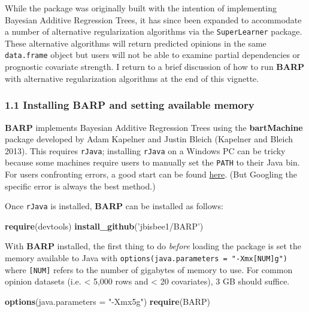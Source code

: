 \documentclass[]{article}
\newenvironment{Shaded}{\begin{snugshade}}{\end{snugshade}}
\newcommand{\KeywordTok}[1]{\textcolor[rgb]{0.13,0.29,0.53}{\textbf{#1}}}
\newcommand{\DataTypeTok}[1]{\textcolor[rgb]{0.13,0.29,0.53}{#1}}
\newcommand{\StringTok}[1]{\textcolor[rgb]{0.31,0.60,0.02}{#1}}
\newcommand{\NormalTok}[1]{#1}
\begin{document}
While the package was originally built with the intention of
implementing Bayesian Additive Regression Trees, it has since been
expanded to accommodate a number of alternative regularization
algorithms via the \texttt{SuperLearner} package. These alternative
algorithms will return predicted opinions in the same
\texttt{data.frame} object but users will not be able to examine partial
dependencies or prognostic covariate strength. I return to a brief
discussion of how to run \textbf{BARP} with alternative regularization
algorithms at the end of this vignette.

\subsubsection{\texorpdfstring{1.1 Installing \textbf{BARP} and setting
available
memory}{1.1 Installing BARP and setting available memory}}\label{installing-barp-and-setting-available-memory}

\textbf{BARP} implements Bayesian Additive Regression Trees using the
\textbf{bartMachine} package developed by Adam Kapelner and Justin
Bleich (Kapelner and Bleich 2013). This requires \texttt{rJava};
installing \texttt{rJava} on a Windows PC can be tricky because some
machines require users to manually set the \texttt{PATH} to their Java
bin. For users confronting errors, a good start can be found
\href{https://www.r-statistics.com/2012/08/how-to-load-the-rjava-package-after-the-error-java_home-cannot-be-determined-from-the-registry/}{here}.
(But Googling the specific error is always the best method.)

Once \texttt{rJava} is installed, \textbf{BARP} can be installed as
follows:

\begin{Shaded}
\begin{Highlighting}[]
\KeywordTok{require}\NormalTok{(devtools)}
\KeywordTok{install_github}\NormalTok{(}\StringTok{'jbisbee1/BARP'}\NormalTok{)}
\end{Highlighting}
\end{Shaded}

With \textbf{BARP} installed, the first thing to do \emph{before}
loading the package is set the memory available to Java with
\texttt{options(java.parameters\ =\ "-Xmx{[}NUM{]}g")} where
\texttt{{[}NUM{]}} refers to the number of gigabytes of memory to use.
For common opinion datasets (i.e. \textless{} 5,000 rows and \textless{}
20 covariates), 3 GB should suffice.

\begin{Shaded}
\begin{Highlighting}[]
\KeywordTok{options}\NormalTok{(}\DataTypeTok{java.parameters =} \StringTok{"-Xmx5g"}\NormalTok{)}
\KeywordTok{require}\NormalTok{(BARP)}
\end{Highlighting}
\end{Shaded}
\end{document}
